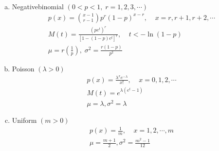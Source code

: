 \documentclass{article}
\begin{document}
\begin{enumerate}[(a)]
            \item Negativebinomial $(0 < p < 1, \; r = 1, 2, 3, \cdots)$
            $$
            \begin{aligned}
                & p(x) = \binom{x - 1}{r - 1}p^r(1 - p)^{x - r}, \;\;\;\; x = r, r + 1, r + 2, \cdots \\
                & M(t) = \frac{(pe^t)^r}{[1 - (1 - p)e^t]^r}, \;\;\;\; t < -\ln{(1 - p)} \\
                & \mu = r\left(\frac{1}{p}\right), \; \sigma^2 = \frac{r(1 - p)}{p^2}
            \end{aligned}
            $$
            
            \item Poisson $(\lambda > 0)$
            $$
            \begin{aligned}
                & p(x) = \frac{\lambda^x e^{-\lambda}}{x!}, \;\;\;\; x = 0, 1, 2, \cdots \\
                & M(t) = e^{\lambda(e^t - 1)} \\
                & \mu = \lambda, \sigma^2 = \lambda
            \end{aligned}
            $$
            
            \item Uniform $(m > 0)$
            $$
            \begin{aligned}
                & p(x) = \frac{1}{m}, \;\;\;\; x = 1, 2, \cdots, m \\
                & \mu = \frac{m + 1}{2}, \sigma^2 = \frac{m^2 - 1}{12}
            \end{aligned}
            $$
        \end{enumerate}
\end{document}
